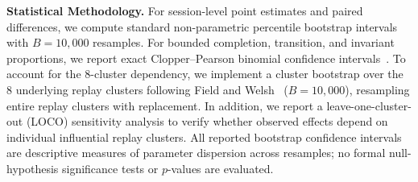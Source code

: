 \noindent\textbf{Statistical Methodology.}
For session-level point estimates and paired differences, we compute standard non-parametric percentile bootstrap intervals with $B = 10{,}000$ resamples. For bounded completion, transition, and invariant proportions, we report exact Clopper--Pearson binomial confidence intervals~\cite{cp34}. To account for the 8-cluster dependency, we implement a cluster bootstrap over the 8 underlying replay clusters following Field and Welsh~\cite{fw07} ($B = 10{,}000$), resampling entire replay clusters with replacement. In addition, we report a leave-one-cluster-out (LOCO) sensitivity analysis to verify whether observed effects depend on individual influential replay clusters. All reported bootstrap confidence intervals are descriptive measures of parameter dispersion across resamples; no formal null-hypothesis significance tests or $p$-values are evaluated.
